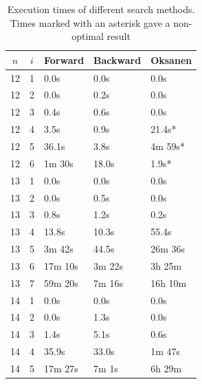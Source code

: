 \documentclass[twoside,leqno,twocolumn]{article}
\begin{document}
\begin{table}[!t]
  \renewcommand{\arraystretch}{1.2}
  \caption{Execution times of different search methods. Times marked with an asterisk gave a non-optimal result }
  \label{table:search_algorithms}
  \centering
  \begin{tabular}{c|c|l|l|l}
    $n$ & $i$ & \textbf{Forward} & \textbf{Backward} & \textbf{Oksanen} \\
    \hline
    12  & 1   & 0.0s             & 0.0s              & 0.0s             \\
    12  & 2   & 0.0s             & 0.2s              & 0.0s             \\
    12  & 3   & 0.4s             & 0.6s              & 0.0s             \\
    12  & 4   & 3.5s             & 0.9s              & 21.4s*           \\
    12  & 5   & 36.1s            & 3.8s              & 4m 59s*          \\
    12  & 6   & 1m 30s           & 18.0s             & 1.9s*            \\
    \hline
    13  & 1   & 0.0s             & 0.0s              & 0.0s             \\
    13  & 2   & 0.0s             & 0.5s              & 0.0s             \\
    13  & 3   & 0.8s             & 1.2s              & 0.2s             \\
    13  & 4   & 13.8s            & 10.3s             & 55.4s            \\
    13  & 5   & 3m 42s           & 44.5s             & 26m 36s          \\
    13  & 6   & 17m 10s          & 3m 22s            & 3h 25m           \\
    13  & 7   & 59m 20s          & 7m 16s            & 16h 10m          \\
    \hline
    14  & 1   & 0.0s             & 0.0s              & 0.0s             \\
    14  & 2   & 0.0s             & 1.3s              & 0.0s             \\
    14  & 3   & 1.4s             & 5.1s              & 0.6s             \\
    14  & 4   & 35.9s            & 33.0s             & 1m 47s           \\
    14  & 5   & 17m 27s          & 7m 1s             & 6h 29m           \\

\end{tabular}
\end{table}
\end{document}
